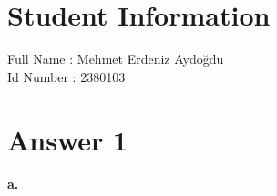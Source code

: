 \documentclass[11pt]{article}
\begin{document}
\section*{Student Information } 
Full Name :  Mehmet Erdeniz Aydoğdu \\
Id Number :  2380103

\section*{Answer 1}
\paragraph{a.}
\renewcommand{\theenumi}{\textbf{\roman{enumi}}}%
\end{document}

